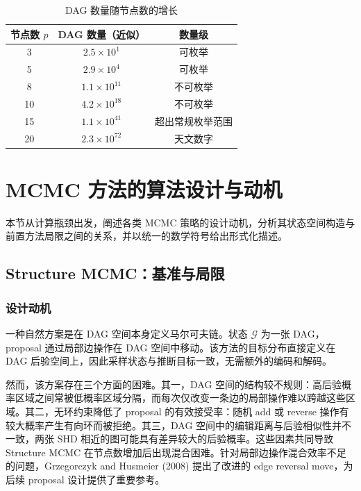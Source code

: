\documentclass[UTF8,a4paper,12pt]{ctexart}
\begin{document}
\begin{table}[htbp]
\centering
\caption{DAG 数量随节点数的增长}
\label{tab:dag_count}
\begin{tabular}{c|c|c}
\toprule
节点数 $p$ & DAG 数量（近似） & 数量级 \\
\midrule
3  & $2.5 \times 10^1$   & 可枚举 \\
5  & $2.9 \times 10^4$   & 可枚举 \\
8  & $1.1 \times 10^{11}$ & 不可枚举 \\
10 & $4.2 \times 10^{18}$ & 不可枚举 \\
15 & $1.1 \times 10^{41}$ & 超出常规枚举范围 \\
20 & $2.3 \times 10^{72}$ & 天文数字 \\
\bottomrule
\end{tabular}
\end{table}

\FloatBarrier
\newpage
\section{MCMC 方法的算法设计与动机}

本节从计算瓶颈出发，阐述各类 MCMC 策略的设计动机，分析其状态空间构造与前置方法局限之间的关系，并以统一的数学符号给出形式化描述。

\subsection{Structure MCMC：基准与局限}

\subsubsection{设计动机}

一种自然方案是在 DAG 空间本身定义马尔可夫链。状态 $\mathcal{G}$ 为一张 DAG，proposal 通过局部边操作在 DAG 空间中移动。该方法的目标分布直接定义在 DAG 后验空间上，因此采样状态与推断目标一致，无需额外的编码和解码。

然而，该方案存在三个方面的困难。其一，DAG 空间的结构较不规则：高后验概率区域之间常被低概率区域分隔，而每次仅改变一条边的局部操作难以跨越这些区域。其二，无环约束降低了 proposal 的有效接受率：随机 add 或 reverse 操作有较大概率产生有向环而被拒绝。其三，DAG 空间中的编辑距离与后验相似性并不一致，两张 SHD 相近的图可能具有差异较大的后验概率。这些因素共同导致 Structure MCMC 在节点数增加后出现混合困难。针对局部边操作混合效率不足的问题，Grzegorczyk and Husmeier (2008) 提出了改进的 edge reversal move，为后续 proposal 设计提供了重要参考\citep{grzegorczyk2008improving}。
\end{document}
